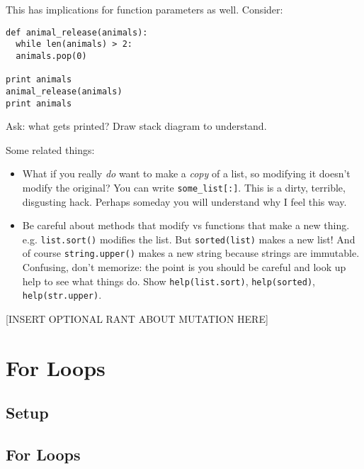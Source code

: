 \documentclass{article}
\begin{document}
This has implications for function parameters as well.  Consider:

\begin{verbatim}
def animal_release(animals):
  while len(animals) > 2:
  animals.pop(0)

print animals
animal_release(animals)
print animals
\end{verbatim}

Ask: what gets printed?  Draw stack diagram to understand.

Some related things:
\begin{itemize}
\item What if you really \emph{do} want to make a \emph{copy} of a
  list, so modifying it doesn't modify the original?  You can write
  \verb|some_list[:]|.  This is a dirty, terrible, disgusting hack.
  Perhaps someday you will understand why I feel this way.
\item Be careful about methods that modify vs functions that make a
  new thing.  e.g. \verb|list.sort()| modifies the list.  But
  \verb|sorted(list)| makes a new list!  And of course
  \verb|string.upper()| makes a new string because strings are
  immutable.  Confusing, don't memorize: the point is you should be
  careful and look up help to see what things do.  Show
  \verb|help(list.sort)|, \verb|help(sorted)|, \verb|help(str.upper)|.
\end{itemize}

[INSERT OPTIONAL RANT ABOUT MUTATION HERE]

\newpage
\section{For Loops}

\subsection*{Setup}

\subsection*{For Loops}
\end{document}
